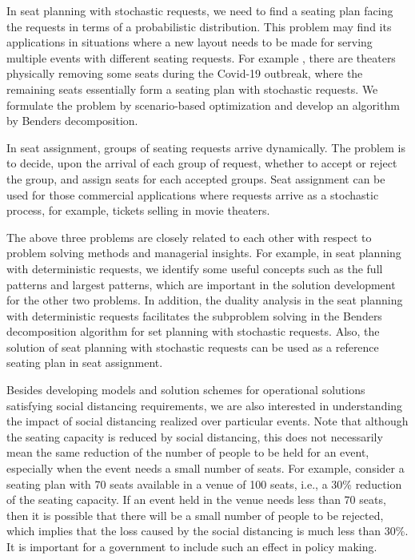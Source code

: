 In seat planning with stochastic requests, we need to find a seating plan facing the requests in terms of a probabilistic distribution. This problem may find its applications in situations where a new layout needs to be made for serving multiple events with different seating requests. For example  \cite{Berlin_theater}, there are theaters physically removing some seats during the Covid-19 outbreak, where the remaining seats essentially form a seating plan with stochastic requests. We formulate the problem by scenario-based optimization and develop an algorithm by Benders decomposition.

In seat assignment, groups of seating requests arrive dynamically. The problem is to decide, upon the arrival of each group of request, whether to accept or reject the group, and assign seats for each accepted groups. Seat assignment can be used for those commercial applications where requests arrive as a stochastic process, for example, tickets selling in movie theaters.

The above three problems are closely related to each other with respect to problem solving methods and managerial insights. For example, in seat planning with deterministic requests,
we identify some useful concepts such as the full patterns and largest patterns, which are important in the solution development for the other two problems. In addition, the duality analysis in the seat planning with deterministic requests facilitates the subproblem solving in the Benders decomposition algorithm for set planning with stochastic requests. 
Also, the solution of seat planning with stochastic requests can be used  as a reference seating plan in seat assignment.


Besides developing models and solution schemes for operational solutions satisfying  social distancing requirements, we are also interested in understanding the impact of social  distancing realized over  particular events. Note that although the seating capacity  is reduced by social distancing, this does not necessarily mean the same reduction of the number of people to be held for an event, especially when the event  needs a small number of seats. For example, consider a seating plan with 70 seats available in a venue of 100 seats, i.e., a 30\% reduction of the seating capacity. If an event held in the venue needs less than 70 seats, then it is possible that there will be a small number of people to be rejected, which implies that the loss caused by the social distancing is much less than 30\%. It is important for a government to include such an effect in policy making.

